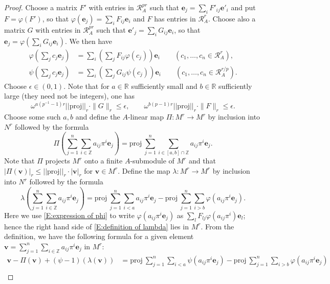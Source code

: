 \documentclass[12pt]{article}
\theoremstyle{definition}
\numberwithin{equation}{theorem}
\newcommand{\calR}{\mathcal{R}}
\newcommand{\RR}{\mathbb{R}}
\newcommand{\ZZ}{\mathbb{Z}}
\newcommand{\bbe}{\mathbf{e}}
\newcommand{\bbv}{\mathbf{v}}
\begin{document}
\begin{proof}
Choose a matrix $F'$ with entries in $\calR^{pr}_A$ such that $\bbe_j = \sum_i F'_{ij} \bbe'_i$
and put $F = \varphi(F')$, so that $\varphi(\bbe_j) = \sum_i F_{ij} \bbe_i$ and $F$ has entries in $\calR_A^r$.
Choose also a matrix $G$ with entries in $\calR^{pr}_A$ such that $\bbe'_j = \sum_i G_{ij} \bbe_i$, so that $\bbe_j =
\varphi(\sum_i G_{ij} \bbe_i)$.
We then have
\begin{align}
\label{E:expression of phi}
\varphi\left(\sum_j c_j \bbe_j\right)&= \sum_i \left( \sum_j F_{ij}\varphi(c_j) \right) \bbe_i \qquad (c_1,\dots,c_n \in \calR_A^r), \\
\label{E:expression of psi}
\psi\left(\sum_j c_j \bbe_j\right) &= \sum_i \left( \sum_j G_{ij}\psi(c_j)\right) \bbe_i \qquad (c_1, \dots, c_n \in 
\calR_A^{r/p}).
\end{align}
Choose $\epsilon \in (0,1)$.
Note that for $a \in \RR$ sufficiently small and $b \in \RR$ sufficiently large (they need not be integers), one has
\[
\omega^{a(p^{-1}-1)r} ||\mathrm{proj}||_r \cdot \|G\|_{r}\leq \epsilon, \qquad \omega^{b(p-1)r}
||\mathrm{proj}||_r \cdot \|F\|_{r} \leq \epsilon.
\]
Choose some such $a,b$ and define the $A$-linear map $\Pi: M^r \to
M^r$ by inclusion into $N^r$ followed by the formula
\[
\Pi\left( \sum_{j=1}^n \sum_{i \in \ZZ} a_{ij} \pi^i \bbe_j\right) = \mathrm{proj}\  \sum_{j=1}^n \sum_{i \in [a,b] \cap \ZZ} a_{ij} \pi^i \bbe_j.
\]
Note that $\Pi$ projects $M^r$ onto a finite $A$-submodule of $M^r$
and that $|\Pi(\bbv)|_r\leq ||\mathrm{proj}||_r \cdot |\bbv|_r$ for
$\bbv \in M^r$.  Define the map $\lambda: M^r \to M^r$ by inclusion
into $N^r$ followed by the formula
\begin{equation}
\label{E:definition of lambda}
\lambda\left( \sum_{j=1}^n \sum_{i \in \ZZ} a_{ij} \pi^i \bbe_j \right)
= \mathrm{proj}\ \sum_{j=1}^n \sum_{i<a} a_{ij} \pi^i \bbe_j -
\mathrm{proj}\  \sum_{j=1}^n \sum_{i>b} \varphi(a_{ij} \pi^i \bbe_j).
\end{equation}
Here we use \eqref{E:expression of phi} to write $\varphi(a_{ij} \pi^i
\bbe_j)$ as $\sum_{l}F_{lj} \varphi(a_{ij}\pi^i)\bbe_l$; hence the
right hand side of \eqref{E:definition of lambda} lies in $M^r$.  From
the definition, we have the following formula for a given element
$\bbv = \sum_{j= 1}^n\sum_{i \in \ZZ}a_{ij}\pi^i\bbe_j$ in $ M^r$:
\begin{align}
\nonumber
\bbv - \Pi(\bbv) + (\psi-1)(\lambda(\bbv)) &= \mathrm{proj} \  \sum_{j=1}^n \sum_{i<a} \psi( a_{ij} \pi^i \bbe_j) -
\mathrm{proj}\  \sum_{j=1}^n \sum_{i>b} \varphi(a_{ij} \pi^i \bbe_j)\\

\end{align}
\end{proof}
\end{document}
